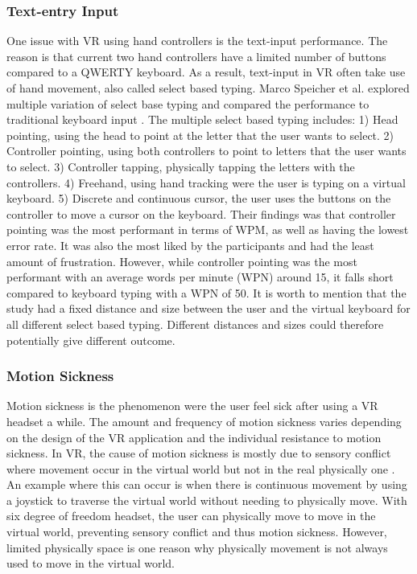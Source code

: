 \documentclass[screen, sigcconf]{timtm}
\begin{document}
\subsubsection{Text-entry Input}
One issue with VR using hand controllers is the text-input performance. The reason is that current two hand controllers have a limited number of buttons compared to a QWERTY keyboard. As a result, text-input in VR often take use of hand movement, also called select based typing. Marco Speicher et al. explored multiple variation of select base typing and compared the performance to traditional keyboard input \cite{speicher_selection-based_2018}. The multiple select based typing includes: 1) Head pointing, using the head to point at the letter that the user wants to select. 2) Controller pointing, using both controllers to point to letters that the user wants to select. 3) Controller tapping, physically tapping the letters with the controllers. 4) Freehand, using hand tracking were the user is typing on a virtual keyboard. 5) Discrete and continuous cursor, the user uses the buttons on the controller to move a cursor on the keyboard. Their findings was that controller pointing was the most performant in terms of WPM, as well as having the lowest error rate. It was also the most liked by the participants and had the least amount of frustration. However, while controller pointing was the most performant with an average words per minute (WPN) around 15, it falls short compared to keyboard typing with a WPN of 50. It is worth to mention that the study had a fixed distance and size between the user and the virtual keyboard for all different select based typing. Different distances and sizes could therefore potentially give different outcome.

\subsubsection{Motion Sickness}
Motion sickness is the phenomenon were the user feel sick after using a VR headset a while. The amount and frequency of motion sickness varies depending on the design of the VR application and the individual resistance to motion sickness. In VR, the cause of motion sickness is mostly due to sensory conflict where movement occur in the virtual world but not in the real physically one \cite{golding_motion_2006}. An example where this can occur is when there is continuous movement by using a joystick to traverse the virtual world without needing to physically move. With six degree of freedom headset, the user can physically move to move in the virtual world, preventing sensory conflict and thus motion sickness. However, limited physically space is one reason why physically movement is not always used to move in the virtual world.
\end{document}
